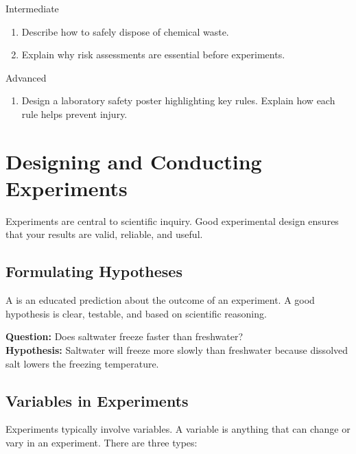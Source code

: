\begin{tieredquestions}{Intermediate}
\begin{enumerate}
    \item Describe how to safely dispose of chemical waste.
    \item Explain why risk assessments are essential before experiments.
\end{enumerate}
\end{tieredquestions}

\begin{tieredquestions}{Advanced}
\begin{enumerate}
    \item Design a laboratory safety poster highlighting key rules. Explain how each rule helps prevent injury.
\end{enumerate}
\end{tieredquestions}

\section{Designing and Conducting Experiments}

Experiments are central to scientific inquiry. Good experimental design ensures that your results are valid, reliable, and useful.

\subsection{Formulating Hypotheses}

A  is an educated prediction about the outcome of an experiment. A good hypothesis is clear, testable, and based on scientific reasoning.

\begin{example}
\textbf{Question:} Does saltwater freeze faster than freshwater?\\
\textbf{Hypothesis:} Saltwater will freeze more slowly than freshwater because dissolved salt lowers the freezing temperature.
\end{example}

\subsection{Variables in Experiments}

Experiments typically involve variables. A variable is anything that can change or vary in an experiment. There are three types:

